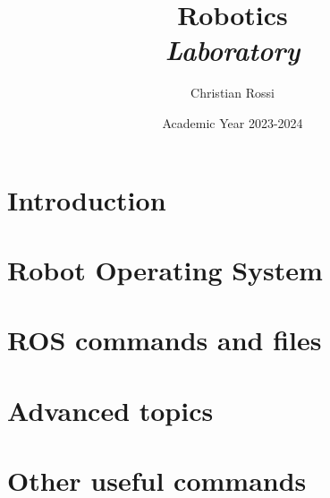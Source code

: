 \documentclass[12pt, a4paper]{report}
\title{Robotics \\ \textit{Laboratory}}
\author{Christian Rossi}
\date{Academic Year 2023-2024}
\begin{document}
    \maketitle

    

    \cleardoublepage

    \tableofcontents

    \cleardoublepage

    \chapter{Introduction}
    
    

    \chapter{Robot Operating System}
    
    
    

    \chapter{ROS commands and files}
    
     
     
     
     
     
     
     
     
     

    \chapter{Advanced topics}
    
    
    
    
    
    

    \appendix
    \chapter{Other useful commands}
    
\end{document}
